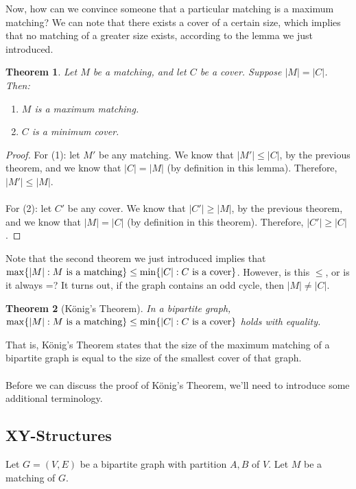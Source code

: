 \documentclass[]{article}
\newtheorem*{theorem}{Theorem}
\theoremstyle{definition}
\DeclarePairedDelimiter{\set}{\lbrace}{\rbrace}
\begin{document}
			Now, how can we convince someone that a particular matching is a maximum matching? We can note that there exists a cover of a certain size, which implies that no matching of a greater size exists, according to the lemma we just introduced.

			\begin{theorem}
				Let $M$ be a matching, and let $C$ be a cover. Suppose $|M| = |C|$. Then:
				\begin{enumerate}
					\item $M$ is a maximum matching.
					\item $C$ is a minimum cover.
				\end{enumerate}
			\end{theorem}

			\begin{proof}
				For (1): let $M'$ be any matching. We know that $|M'| \le |C|$, by the previous theorem, and we know that $|C| = |M|$ (by definition in this lemma). Therefore, $|M'| \le |M|$.
				\\ \\
				For (2): let $C'$ be any cover. We know that $|C'| \ge |M|$, by the previous theorem, and we know that $|M| = |C|$ (by definition in this theorem). Therefore, $|C'| \ge |C|$.
			\end{proof}

			Note that the second theorem we just introduced implies that $\max \set{|M| : M \text{ is a matching}} \le \min \set{|C| : C \text{ is a cover}}$. However, is this $\le$, or is it always =? It turns out, if the graph contains an odd cycle, then $|M| \ne |C|$.

			\begin{theorem}[K\"onig's Theorem]
				In a bipartite graph, $\max \set{|M| : M \text{ is a matching}} \le \min \set{|C| : C \text{ is a cover}}$ holds with equality.
			\end{theorem}

			That is, K\"onig's Theorem states that the size of the maximum matching of a bipartite graph is equal to the size of the smallest cover of that graph.
			\\ \\
			Before we can discuss the proof of K\"onig's Theorem, we'll need to introduce some additional terminology.

		\subsection{XY-Structures}
			Let $G = (V, E)$ be a bipartite graph with partition $A, B$ of $V$. Let $M$ be a matching of $G$.
\end{document}
